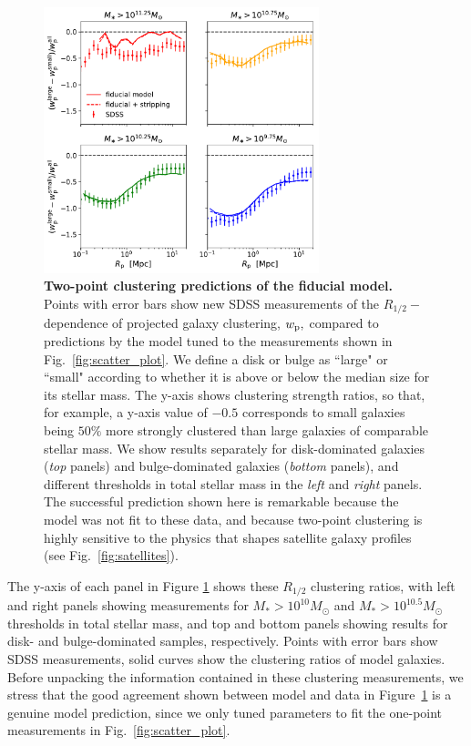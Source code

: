\documentclass[usenatbib,usegraphicx,letterpaper]{mn2e}
\newcommand{\rhalf}{R_{1/2}}
\newcommand{\mstar}{M_{\ast}}
\newcommand{\wproj}{w_{\rm p}}
\begin{document}
\begin{figure}
\centering
\includegraphics[width=8cm]{FIGS/size_clustering_ratios_stripping_model_vs_sdss.pdf}
\caption{
{\bf Two-point clustering predictions of the fiducial model.}
Points with error bars show new SDSS measurements of the $\rhalf-$dependence of projected galaxy clustering, $\wproj,$ compared to predictions by the model tuned to the measurements shown in Fig.~\ref{fig:scatter_plot}. We define a disk or bulge as ``large" or ``small" according to whether it is above or below the median size for its stellar mass. The y-axis shows clustering strength ratios, so that, for example, a y-axis value of $-0.5$ corresponds to small galaxies being $50\%$ more strongly clustered than large galaxies of comparable stellar mass. We show results separately for disk-dominated galaxies ({\em top} panels) and bulge-dominated galaxies ({\em bottom }panels), and different thresholds in total stellar mass in the {\em left} and {\em right} panels. The successful prediction shown here is remarkable because the model was not fit to these data, and because two-point clustering is highly sensitive to the physics that shapes satellite galaxy profiles (see Fig.~\ref{fig:satellites}).
}
\label{fig:clustering_ratio_upshot}
\end{figure}


The y-axis of each panel in Figure \ref{fig:clustering_ratio_upshot} shows these $\rhalf$ clustering ratios, with left and right panels showing measurements for $\mstar>10^{10}M_{\odot}$ and $\mstar>10^{10.5}M_{\odot}$ thresholds in total stellar mass, and top and bottom panels showing results for disk- and bulge-dominated samples, respectively. Points with error bars show SDSS measurements, solid curves show the clustering ratios of model galaxies. Before unpacking the information contained in these clustering measurements, we stress that the good agreement shown between model and data in Figure~\ref{fig:clustering_ratio_upshot} is a genuine model prediction, since we only tuned parameters to fit the one-point measurements in Fig.~\ref{fig:scatter_plot}.
\end{document}
